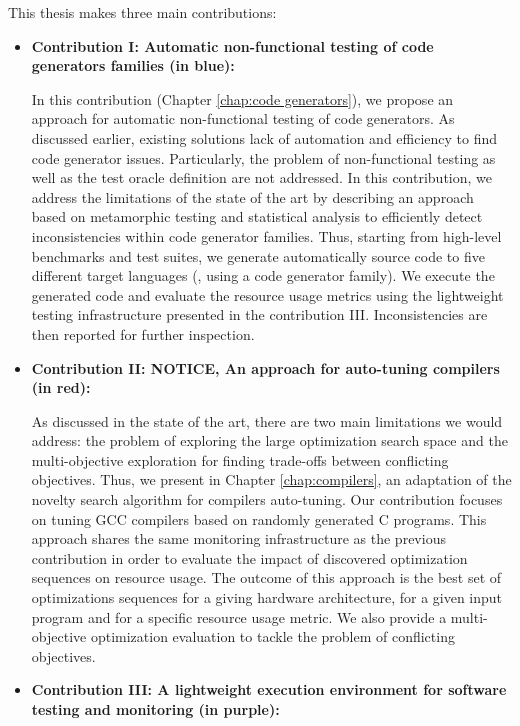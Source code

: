 This thesis makes three main contributions:
\begin{itemize}
	\item \textbf{Contribution I: Automatic non-functional testing of code generators families (in blue): }
	
	In this contribution (Chapter \ref{chap:code generators}), we propose an approach for automatic non-functional  testing of code generators. As discussed earlier, existing solutions lack of automation and efficiency to find code generator issues. Particularly, the problem of non-functional testing as well as the test oracle definition are not addressed. In this contribution, we address the limitations of the state of the art by describing an approach based on metamorphic testing and statistical analysis to efficiently detect inconsistencies within code generator families.
	Thus, starting from high-level benchmarks and test suites, we generate automatically source code to five different target languages (\ie, using a code generator family). We execute the generated code and evaluate the resource usage metrics using the lightweight testing infrastructure presented in the contribution III. Inconsistencies are then reported for further inspection.  
	
	\item \textbf{Contribution II: NOTICE, An approach for auto-tuning compilers (in red):}
	
	As discussed in the state of the art, there are two main limitations we would address: the problem of exploring the large optimization search space and the multi-objective exploration for finding trade-offs between conflicting objectives. 
	Thus, we present in Chapter \ref{chap:compilers}, an adaptation of the novelty search algorithm for compilers auto-tuning. Our contribution focuses on tuning GCC compilers based on randomly generated C programs.
	This approach shares the same monitoring infrastructure as the previous contribution in order to evaluate the impact of discovered optimization sequences on resource usage. The outcome of this approach is the best set of optimizations sequences for a giving hardware architecture, for a given input program and for a specific resource usage metric. We also provide a multi-objective optimization evaluation to tackle the problem of conflicting objectives.
	
	\item \textbf{Contribution III: A lightweight execution environment for software testing and monitoring (in purple):}
	

\end{itemize}
